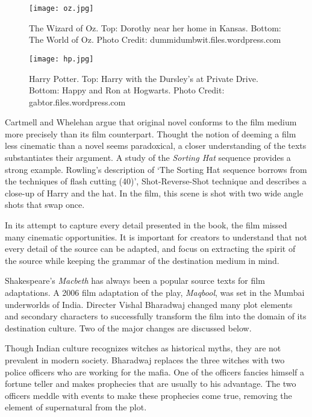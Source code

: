 \documentclass[12pt]{article}
\begin{document}
\begin{figure}
\begin{minipage}[b]{0.5\linewidth}
\centering
\texttt{[image: oz.jpg]}
\caption{The Wizard of Oz. Top: Dorothy near her home in Kansas. Bottom: The World of Oz. Photo Credit: dummidumbwit.files.wordpress.com}
\label{fig}
\end{minipage}
\hspace{0.5cm}
\begin{minipage}[b]{0.5\linewidth}
\centering
\texttt{[image: hp.jpg]}
\caption{Harry Potter. Top: Harry with the Dursley's at Private Drive. Bottom:
Happy and Ron at Hogwarts. Photo Credit: gabtor.files.wordpress.com}
\label{fig:figure2}
\end{minipage}
\end{figure}

Cartmell and Whelehan argue that original novel conforms to the film medium more
precisely than its film counterpart. Thought the notion of deeming a film less 
cinematic than a novel seems paradoxical, a closer understanding of the texts 
substantiates their argument. A study of the \textit{ Sorting Hat }
sequence provides a strong example. Rowling's description of `The Sorting Hat sequence 
borrows from the techniques of flash cutting (40)', Shot-Reverse-Shot technique and 
describes a close-up of Harry and the hat.  In the film, this scene is shot with 
two wide angle shots that swap once.

In its attempt to capture every detail presented in the book, the film missed 
many cinematic opportunities. It
is important for creators to understand that not every detail of the source can
be adapted, and focus on extracting the spirit of the source while
keeping the grammar of the destination medium in mind. 

Shakespeare's \textit{Macbeth} has always been a popular source texts for film
adaptations. A 2006 film adaptation of the play, \textit{Maqbool}, was set in
the Mumbai underworlds of India.
Directer Vishal Bharadwaj changed many plot elements and secondary
characters to successfully transform the film into the domain of its destination
culture. Two of the major changes are discussed below.

Though Indian culture recognizes witches as historical myths,
they are not prevalent in modern society. Bharadwaj replaces the three witches
with two police officers who are working for the mafia. One of the officers
fancies himself a fortune teller and makes prophecies that are usually to his
advantage. The two officers meddle with events to make these prophecies come true,
removing the element of supernatural from the plot.
\end{document}
